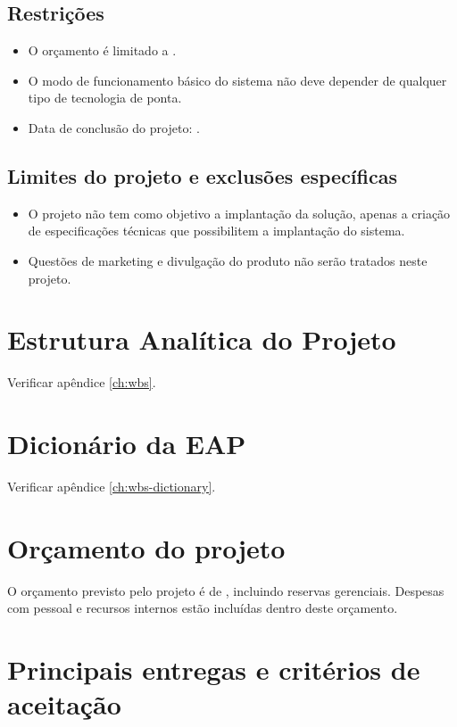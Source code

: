 \subsection{Restrições}

\begin{itemize}
	\item O orçamento é limitado a \maximumBudget.
	\item O modo de funcionamento básico do sistema não deve depender de qualquer tipo de tecnologia de ponta. 
	\item Data de conclusão do projeto: \maximumDeadline.
\end{itemize}

\subsection{Limites do projeto e exclusões específicas}

\begin{itemize}
\item O projeto não tem como objetivo a implantação da solução, apenas a criação de especificações técnicas que possibilitem a implantação do sistema.
\item Questões de marketing e divulgação do produto não serão tratados neste projeto.
\end{itemize}

\section{Estrutura Analítica do Projeto}

Verificar apêndice \ref{ch:wbs}.

\section{Dicionário da EAP}

Verificar apêndice \ref{ch:wbs-dictionary}.

\section{Orçamento do projeto}

O orçamento previsto pelo projeto é de \maximumBudget, incluindo reservas gerenciais. Despesas com pessoal e recursos internos estão incluídas dentro deste orçamento.

\section{Principais entregas e critérios de aceitação}

